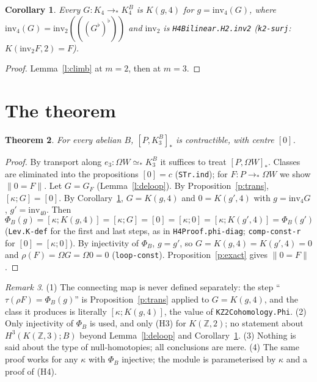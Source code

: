 \documentclass[11pt]{amsart}
\newtheorem{theorem}{Theorem}
\newtheorem{corollary}[theorem]{Corollary}
\theoremstyle{definition}
\theoremstyle{remark}
\newtheorem{remark}[theorem]{Remark}
\newcommand{\Om}{\Omega}
\newcommand{\Z}{\mathbb{Z}}
\newcommand{\code}[1]{\texttt{#1}}
\newcommand{\hc}[2]{[#1,#2]_*}
\newcommand{\tr}[1]{\|#1\|}
\begin{document}
\begin{corollary}\label{c:surj4}
Every $G:K_4\to_*K^B_4$ is $K(g,4)$ for $g=\mathrm{inv}_4(G)$, where
$\mathrm{inv}_4(G)=\mathrm{inv}_2(((G^\flat)^\flat))$ and $\mathrm{inv}_2$
is \code{H4Bilinear.H2.inv2} (\code{k2-surj}: $K(\mathrm{inv}_2F,2)=F$).
\end{corollary}
\begin{proof}
Lemma~\ref{l:climb} at $m=2$, then at $m=3$.
\end{proof}

\section{The theorem}

\begin{theorem}\label{t:main}
For every abelian $B$, $\hc P{K^B_3}$ is contractible, with centre $[0]$.
\end{theorem}
\begin{proof}
By transport along $e_3:\Om W\simeq_*K^B_3$ it suffices to treat
$\hc P{\Om W}$. Classes are eliminated into the propositions $[0]=c$
(\code{STr.ind}); for $F:P\to_*\Om W$ we show $\tr{0=F}$.
Let $G=G_F$ (Lemma~\ref{l:deloop}). By Proposition~\ref{p:trans},
$[\kappa;G]=[0]$. By Corollary~\ref{c:surj4}, $G=K(g,4)$ and
$0=K(g',4)$ with $g=\mathrm{inv}_4G$, $g'=\mathrm{inv}_40$. Then
\[\Phi_B(g)=[\kappa;K(g,4)]=[\kappa;G]=[0]=[\kappa;0]=[\kappa;K(g',4)]=\Phi_B(g')\]
(\code{Lev.K-def} for the first and last steps, as in
\code{H4Proof.phi-diag}; \code{comp-const-r} for $[0]=[\kappa;0]$). By
injectivity of $\Phi_B$, $g=g'$, so $G=K(g,4)=K(g',4)=0$ and
$\rho(F)=\Om G=\Om0=0$ (\code{loop-const}). Proposition~\ref{p:exact}
gives $\tr{0=F}$.
\end{proof}

\begin{remark}
(1) The connecting map is never defined separately: the step
``$\tau(\rho F)=\Phi_B(g)$'' is Proposition~\ref{p:trans} applied to
$G=K(g,4)$, and the class it produces is literally
$[\kappa;K(g,4)]$, the value of \code{KZ2Cohomology.Phi}.
(2) Only injectivity of $\Phi_B$ is used, and only (H3) for $K(\Z,2)$; no
statement about $H^3(K(\Z,3);B)$ beyond Lemma~\ref{l:deloop} and
Corollary~\ref{c:surj4}. (3) Nothing is said about the type of
null-homotopies; all conclusions are mere.
(4) The same proof works for any $\kappa$ with $\Phi_B$ injective; the
module is parameterised by $\kappa$ and a proof of (H4).
\end{remark}
\end{document}
